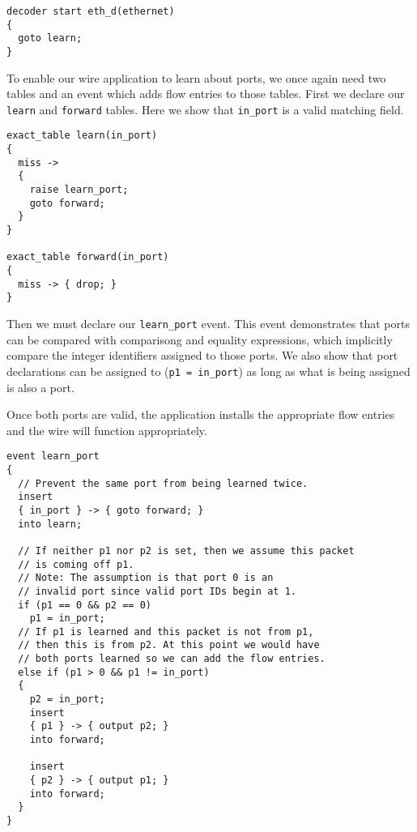 \begin{lstlisting}
decoder start eth_d(ethernet)
{
  goto learn;
}
\end{lstlisting}

To enable our wire application to learn about ports, we once again need two tables and an event which adds flow entries to those tables. First we declare our \texttt{learn} and \texttt{forward} tables. Here we show that \texttt{in\_port} is a valid matching field.

\begin{lstlisting}
exact_table learn(in_port)
{
  miss -> 
  {
  	raise learn_port;
    goto forward;
  }
}

exact_table forward(in_port)
{
  miss -> { drop; }
}
\end{lstlisting}

Then we must declare our \texttt{learn\_port} event. This event demonstrates that ports can be compared with comparisong and equality expressions, which implicitly compare the integer identifiers assigned to those ports. We also show that port declarations can be assigned to (\texttt{p1 = in\_port}) as long as what is being assigned is also a port.

Once both ports are valid, the application installs the appropriate flow entries and the wire will function appropriately.

\noindent\begin{minipage}{\linewidth}
\begin{lstlisting}
event learn_port
{
  // Prevent the same port from being learned twice.
  insert
  { in_port } -> { goto forward; }
  into learn;

  // If neither p1 nor p2 is set, then we assume this packet 
  // is coming off p1.
  // Note: The assumption is that port 0 is an 
  // invalid port since valid port IDs begin at 1.
  if (p1 == 0 && p2 == 0)
    p1 = in_port;
  // If p1 is learned and this packet is not from p1, 
  // then this is from p2. At this point we would have 
  // both ports learned so we can add the flow entries.
  else if (p1 > 0 && p1 != in_port)
  {
    p2 = in_port;
    insert
    { p1 } -> { output p2; }
    into forward;

    insert
    { p2 } -> { output p1; }
    into forward;
  }
}
\end{lstlisting}
\end{minipage}